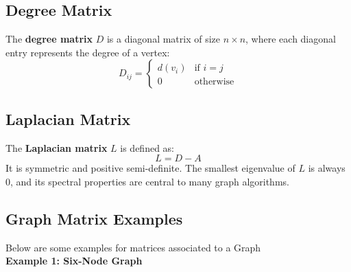 \documentclass[hidelinks,12pt]{article}
\begin{document}
\subsection*{Degree Matrix}
The \textbf{degree matrix} \( D \) is a diagonal matrix of size \( n \times n \), where each diagonal entry represents the degree of a vertex:
\[
D_{ij} = 
\begin{cases}
d(v_i) & \text{if } i = j \\
0 & \text{otherwise}
\end{cases}
\]

\subsection*{Laplacian Matrix}
The \textbf{Laplacian matrix} \( L \) is defined as:
\[
L = D - A
\]
It is symmetric and positive semi-definite. The smallest eigenvalue of \( L \) is always 0, and its spectral properties are central to many graph algorithms.
\newpage
\subsection{Graph Matrix Examples}
Below are some examples for matrices associated to a Graph
\\
\noindent\textbf{Example 1: Six-Node Graph}
\end{document}
